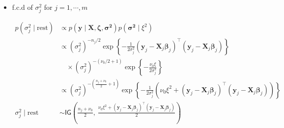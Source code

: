 \begin{appendix}
\begin{itemize}
\begin{equation}
\begin{split}
p(\bm{\Sigma} \mid \text{rest}) 
&\propto  p(\bm{\zeta} \mid \bm{\beta}, \bm{\Sigma}) 
p(\bm{\Sigma}) \\
&\propto |\bm{\Sigma}|^{-m/2} \exp\left\{ -\frac{1}{2} \sum_{j=1}^{m} (\bm{\beta}_j - \bm{\beta})^\top \bm{\Sigma}^{-1} (\bm{\beta}_j - \bm{\beta}) \right\} \\
&\quad \times |\bm{\Sigma}|^{-(n_0 + p + 1)/2} \exp\left\{ -\frac{1}{2} \operatorname{tr}(\bm{S}_0 \bm{\Sigma}^{-1}) \right\} \\[6pt]
&\propto |\bm{\Sigma}|^{-(n_0 + m + p + 1)/2} 
\exp\left\{ -\frac{1}{2} \operatorname{tr} \left(\left[ \bm{S}_0 + \sum_{j=1}^{m} (\bm{\beta}_j - \bm{\beta})(\bm{\beta}_j - \bm{\beta})^\top\right]  \bm{\Sigma}^{-1} \right)\right\}\\
\bm{\Sigma} \mid \text{rest} &\sim \mathsf{IW} \left( 
n_0 + m,\ 
\bm{S}_0 + \sum_{j=1}^{m} (\bm{\beta}_j - \bm{\beta})(\bm{\beta}_j - \bm{\beta})^\top
\right)
\end{split}
\end{equation}

\newpage

\item f.c.d of $\sigma_j^2$ for $j=1,\cdots,m$

\begin{equation}
\begin{split}
p(\sigma_j^2 \mid \text{rest}) 
&\propto p(\bm{y} \mid \bm{X}, \bm{\zeta} ,\bm{\sigma^2}) 
p(\bm{\sigma^2}\mid 
\xi^2) \\
&\propto  ( \sigma_j^2)^{-n_j/2} 
\exp \left\{ -\frac{1}{2\sigma_j^2} (\bm{y}_{j} - \bm{X}_{j} \bm{\beta}_j)^\top(\bm{y}_{j} - \bm{X}_{j} \bm{\beta}_j)  \right\} \\
&\quad \times  (\sigma_j^2)^{-(\nu_0 / 2 + 1)} 
\exp\left\{ -\frac{\nu_0 \xi}{2\sigma_j^2} \right\}\\
&\propto  (\sigma_j^2)^{-\left( \frac{n_j + \nu_0}{2} + 1 \right)} 
\exp\left\{ -\frac{1}{2\sigma_j^2} \left( \nu_0 \xi^2 +  (\bm{y}_{j} - \bm{X}_{j} \bm{\beta}_j)^\top(\bm{y}_{j} - \bm{X}_{j} \bm{\beta}_j) \right) \right\}\\
\sigma_j^2 \mid \text{rest} &\sim \mathsf{IG} \left( 
\frac{n_j + \nu_0}{2},\ 
\frac{ \nu_0 \xi^2 +  (\bm{y}_{j} - \bm{X}_{j} \bm{\beta}_j)^\top(\bm{y}_{j} - \bm{X}_{j} \bm{\beta}_j)}{2} 
\right)
\end{split}
\end{equation}



\end{itemize}
\end{appendix}
